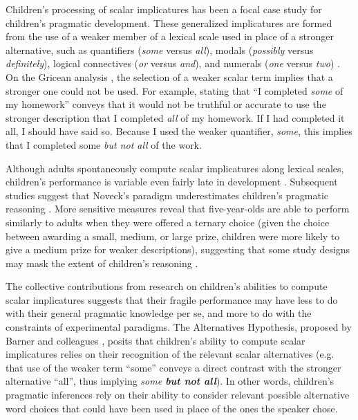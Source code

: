 \documentclass[10pt,letterpaper]{article}
\begin{document}
Children's processing of scalar implicatures has been a focal case study for children's pragmatic development.  These generalized implicatures are formed from the use of a weaker member of a lexical scale used in place of a stronger alternative, such as quantifiers (\emph{some} versus \emph{all}), modals (\emph{possibly} versus \emph{definitely}), logical connectives (\emph{or} versus \emph{and}), and numerals (\emph{one} versus \emph{two}) \citep{horn1984}.  On the Gricean analysis \citep{grice1975}, the selection of a weaker scalar term implies that a stronger one could not be used.  For example, stating that ``I completed \emph{some} of my homework'' conveys that it would not be truthful or accurate to use the stronger description that I completed \emph{all} of my homework.  If I had completed it all, I should have said so.  Because I used the weaker quantifier, \emph{some}, this implies that I completed some \emph{but not all} of the work.  

Although adults spontaneously compute scalar implicatures along lexical scales, children's performance is variable even fairly late in development \citep{noveck2001}.  Subsequent studies suggest that Noveck's paradigm underestimates children's pragmatic reasoning \citep{guasti2005,papafragou2003, papafragou2004}.  More sensitive measures reveal that five-year-olds are able to perform similarly to adults when they were offered a ternary choice (given the choice between awarding a small, medium, or large prize, children were more likely to give a medium prize for weaker descriptions), suggesting that some study designs may mask the extent of children's reasoning \citep{katsos2011}.  

The collective contributions from research on children's abilities to compute scalar implicatures suggests that their fragile performance may have less to do with their general pragmatic knowledge per se, and more to do with the constraints of experimental paradigms. The Alternatives Hypothesis, proposed by Barner and colleagues \citep{barner2010, barner2011}, posits that children's ability to compute scalar implicatures relies on their recognition of the relevant scalar alternatives (e.g. that use of the weaker term ``some'' conveys a direct contrast with the stronger alternative ``all'', thus implying \emph{some \textbf{but not all}}).  In other words, children's pragmatic inferences rely on their ability to consider relevant possible alternative word choices that could have been used in place of the ones the speaker chose.  
\end{document}
